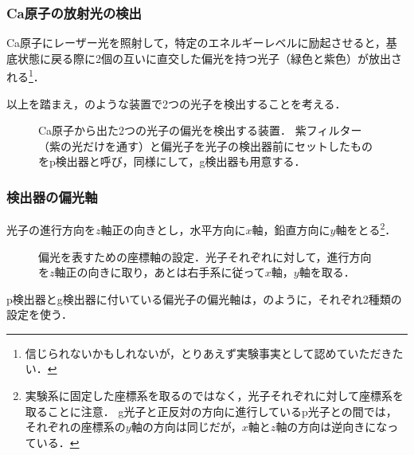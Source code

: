 \documentclass[10pt,b5paper,papersize,dvipdfmx]{jsbook}
\begin{document}
%
\subsubsection{Ca原子の放射光の検出} %

Ca原子にレーザー光を照射して，特定のエネルギーレベルに励起させると，基底状態に戻る際に2個の互いに直交した偏光を持つ光子（緑色と紫色）が放出される\footnote{
  信じられないかもしれないが，とりあえず実験事実として認めていただきたい．
}．\par
以上を踏まえ，のような装置で2つの光子を検出することを考える．

\begin{figure}[htb]
  \centering
  
  \caption{
    Ca原子から出た2つの光子の偏光を検出する装置．
    紫フィルター（紫の光だけを通す）と偏光子を光子の検出器前にセットしたものをp検出器と呼び，同様にして，g検出器も用意する．
  }
  \label{fig:detectors}
\end{figure}

%
\subsubsection{検出器の偏光軸} %
光子の進行方向を$z$軸正の向きとし，水平方向に$x$軸，鉛直方向に$y$軸をとる\footnote{
  実験系に固定した座標系を取るのではなく，光子それぞれに対して座標系を取ることに注意．
  g光子と正反対の方向に進行しているp光子との間では，それぞれの座標系の$y$軸の方向は同じだが，$x$軸と$z$軸の方向は逆向きになっている．
}．
\begin{figure}[ht]
  \centering
  
  \caption{偏光を表すための座標軸の設定．光子それぞれに対して，進行方向を$z$軸正の向きに取り，あとは右手系に従って$x$軸，$y$軸を取る．}
  \label{fig:zahyou-jiku}
\end{figure}

p検出器とg検出器に付いている偏光子の偏光軸は，のように，それぞれ2種類の設定を使う．



\end{document}
